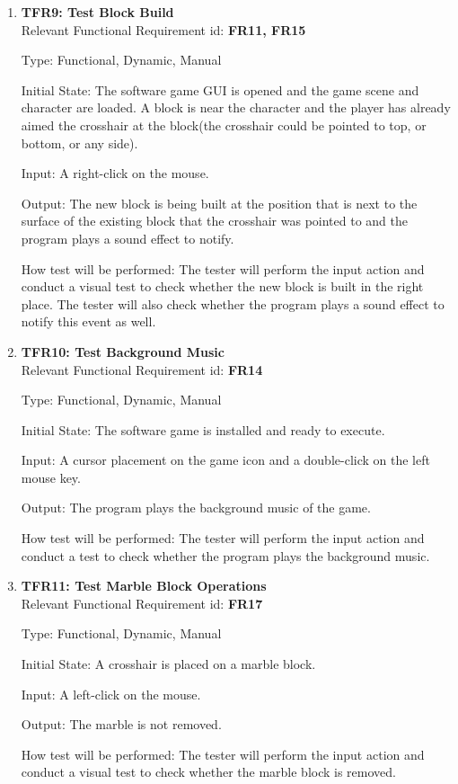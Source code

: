 \documentclass[12pt, titlepage]{article}
\begin{document}
\begin{enumerate}
\item{\textbf{TFR9: Test Block Build}\\}
\label{build}
Relevant Functional Requirement id: \textbf{FR11, FR15}

Type: Functional, Dynamic, Manual

Initial State: The software game GUI is opened and the game scene and character are loaded. A block is near the character and the player has already aimed the crosshair at the block(the crosshair could be pointed to top, or bottom, or any side).

Input: A right-click on the mouse.

Output: The new block is being built at the position that is next to the surface of the existing block that the crosshair was pointed to and the program plays a sound effect to notify.

How test will be performed: The tester will perform the input action and conduct a visual test to check whether the new block is built in the right place. The tester will also check whether the program plays a sound effect to notify this event as well.

\item{\textbf{TFR10: Test Background Music}\\}
Relevant Functional Requirement id: \textbf{FR14}

Type: Functional, Dynamic, Manual

Initial State: The software game is installed and ready to execute.

Input: A cursor placement on the game icon and a double-click on the left mouse key.

Output: The program plays the background music of the game.

How test will be performed: The tester will perform the input action and conduct a test to check whether the program plays the background music.

\item{\textbf{TFR11: Test Marble Block Operations}\\}
Relevant Functional Requirement id: \textbf{FR17}

Type: Functional, Dynamic, Manual

Initial State: A crosshair is placed on a marble block.

Input: A left-click on the mouse.

Output: The marble is not removed.

How test will be performed: The tester will perform the input action and conduct a visual test to check whether the marble block is removed.


\end{enumerate}
\end{document}

